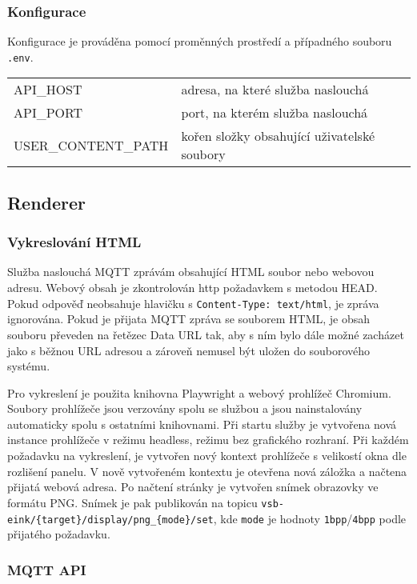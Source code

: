 \subsubsection{Konfigurace}
Konfigurace je prováděna pomocí proměnných prostředí a případného souboru \lstinline{.env}.

\begin{table}[h]
    \begin{tabular}{ll}
        API\_HOST & adresa, na které služba naslouchá \\
        API\_PORT & port, na kterém služba naslouchá \\
        USER\_CONTENT\_PATH & kořen složky obsahující uživatelské soubory \\
    \end{tabular}
\end{table}

\vfill

\subsection{Renderer}
\subsubsection{Vykreslování HTML}
Služba naslouchá MQTT zprávám obsahující HTML soubor nebo webovou adresu. Webový obsah je zkontrolován http požadavkem s metodou HEAD. Pokud odpověď neobsahuje hlavičku s \lstinline|Content-Type: text/html|, je zpráva ignorována. Pokud je přijata MQTT zpráva se souborem HTML, je obsah souboru převeden na řetězec Data URL tak, aby s ním bylo dále možné zacházet jako s běžnou URL adresou a zároveň nemusel být uložen do souborového systému.

Pro vykreslení je použita knihovna Playwright a webový prohlížeč Chromium. Soubory prohlížeče jsou verzovány spolu se službou a jsou nainstalovány automaticky spolu s ostatními knihovnami. Při startu služby je vytvořena nová instance prohlížeče v režimu headless, režimu bez grafického rozhraní. Při každém požadavku na vykreslení, je vytvořen nový kontext prohlížeče s velikostí okna dle rozlišení panelu. V nově vytvořeném kontextu je otevřena nová záložka a načtena přijatá webová adresa. Po načtení stránky je vytvořen snímek obrazovky ve formátu PNG. Snímek je pak publikován na topicu \lstinline|vsb-eink/{target}/display/png_{mode}/set|, kde \lstinline|mode| je hodnoty \lstinline|1bpp|/\lstinline|4bpp| podle přijatého požadavku.

\subsubsection{MQTT API}
